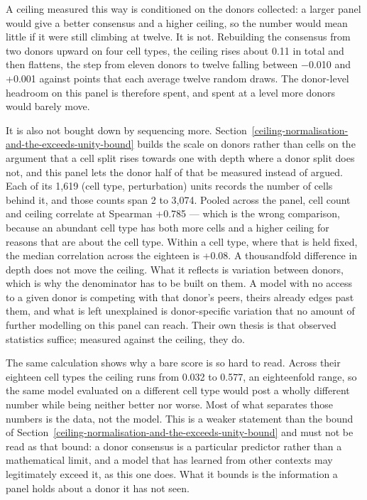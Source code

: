 \documentclass[11pt,a4paper]{article}
\begin{document}
A ceiling measured this way is conditioned on the donors collected: a
larger panel would give a better consensus and a higher ceiling, so the
number would mean little if it were still climbing at twelve. It is not.
Rebuilding the consensus from two donors upward on four cell types, the
ceiling rises about 0.11 in total and then flattens, the step from
eleven donors to twelve falling between −0.010 and +0.001 against points
that each average twelve random draws. The donor-level headroom on this
panel is therefore spent, and spent at a level more donors would barely
move.

It is also not bought down by sequencing more. Section~\ref{ceiling-normalisation-and-the-exceeds-unity-bound} builds the
scale on donors rather than cells on the argument that a cell split
rises towards one with depth where a donor split does not, and this
panel lets the donor half of that be measured instead of argued. Each of
its 1,619 (cell type, perturbation) units records the number of cells
behind it, and those counts span 2 to 3,074. Pooled across the panel,
cell count and ceiling correlate at Spearman +0.785 --- which is the
wrong comparison, because an abundant cell type has both more cells and
a higher ceiling for reasons that are about the cell type. Within a cell
type, where that is held fixed, the median correlation across the
eighteen is +0.08. A thousandfold difference in depth does not move the
ceiling. What it reflects is variation between donors, which is why the
denominator has to be built on them. A model with no access to a given
donor is competing with that donor's peers, theirs already edges past
them, and what is left unexplained is donor-specific variation that no
amount of further modelling on this panel can reach. Their own thesis is
that observed statistics suffice; measured against the ceiling, they do.

The same calculation shows why a bare score is so hard to read. Across
their eighteen cell types the ceiling runs from 0.032 to 0.577, an
eighteenfold range, so the same model evaluated on a different cell type
would post a wholly different number while being neither better nor
worse. Most of what separates those numbers is the data, not the model.
This is a weaker statement than the bound of Section~\ref{ceiling-normalisation-and-the-exceeds-unity-bound} and must not be
read as that bound: a donor consensus is a particular predictor rather
than a mathematical limit, and a model that has learned from other
contexts may legitimately exceed it, as this one does. What it bounds is
the information a panel holds about a donor it has not seen.
\end{document}
